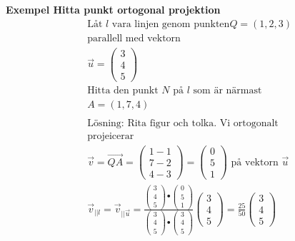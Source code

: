 \begin{multicols}{2}
\textbf{Exempel Hitta punkt ortogonal projektion} %
\begin{align*} 
  &\text{Låt $l$ vara linjen genom punkten} Q=(1,2,3) \\ 
  &\text{parallell med vektorn} \\
  &\vec{u} =
  \begin{pmatrix}  3 \\  4 \\  5  \end{pmatrix} \\
  &\text{Hitta den punkt $N$ på $l$ som är närmast} \\
  &A=(1,7,4) \\
  &\\
  &\text{Lösning: Rita figur och tolka. Vi ortogonalt} \\
  &\text{projeicerar} \\
  &\vec{v} = \overrightarrow{QA} =
  \begin{pmatrix}  1-1 \\  7-2 \\  4-3  \end{pmatrix} =
  \begin{pmatrix}  0 \\  5 \\ 1  \end{pmatrix} \text{ på vektorn }  \vec{u} \\
  &\vec{v}_{||l} = \vec{v}_{||\vec{u}} = \frac{
    \begin{pmatrix} 3 \\ 4 \\ 5 \end{pmatrix} \bullet \begin{pmatrix} 0 \\ 5 \\ 1 \end{pmatrix}}{
    \begin{pmatrix} 3 \\ 4 \\ 5 \end{pmatrix} \bullet \begin{pmatrix} 3 \\ 4 \\ 5 \end{pmatrix}}
  \begin{pmatrix} 3 \\ 4 \\ 5 \end{pmatrix}
  = \frac{25}{50}\begin{pmatrix} 3 \\ 4 \\ 5 \end{pmatrix} \\

\end{align*}
\end{multicols}
